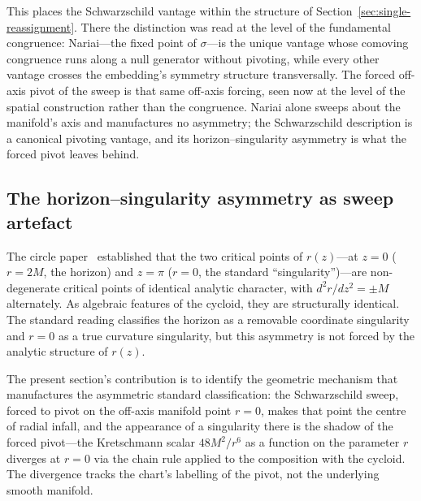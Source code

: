 \documentclass[11pt,a4paper]{article}
\theoremstyle{definition}
\begin{document}
This places the Schwarzschild vantage within the structure of Section~\ref{sec:single-reassignment}. There the distinction was read at the level of the fundamental congruence: Nariai---the fixed point of $\sigma$---is the unique vantage whose comoving congruence runs along a null generator without pivoting, while every other vantage crosses the embedding's symmetry structure transversally. The forced off-axis pivot of the sweep is that same off-axis forcing, seen now at the level of the spatial construction rather than the congruence. Nariai alone sweeps about the manifold's axis and manufactures no asymmetry; the Schwarzschild description is a canonical pivoting vantage, and its horizon--singularity asymmetry is what the forced pivot leaves behind.

\subsection{The horizon--singularity asymmetry as sweep artefact}\label{sec:asymmetry}

The circle paper~\cite{JanzenCircle} established that the two critical points of $r(z)$---at $z=0$ ($r=2M$, the horizon) and $z=\pi$ ($r=0$, the standard ``singularity'')---are non-degenerate critical points of identical analytic character, with $d^{2}r/dz^{2}=\pm M$ alternately. As algebraic features of the cycloid, they are structurally identical. The standard reading classifies the horizon as a removable coordinate singularity and $r=0$ as a true curvature singularity, but this asymmetry is not forced by the analytic structure of $r(z)$.

The present section's contribution is to identify the geometric mechanism that manufactures the asymmetric standard classification: the Schwarzschild sweep, forced to pivot on the off-axis manifold point $r=0$, makes that point the centre of radial infall, and the appearance of a singularity there is the shadow of the forced pivot---the Kretschmann scalar $48M^{2}/r^{6}$ as a function on the parameter $r$ diverges at $r=0$ via the chain rule applied to the composition with the cycloid. The divergence tracks the chart's labelling of the pivot, not the underlying smooth manifold.
\end{document}
